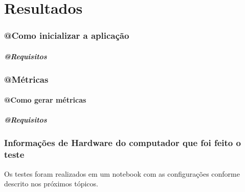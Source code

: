 \part{Resultados}


\section{@Como inicializar a aplicação}

\subsubsection{@Requisitos}

\section{@Métricas}

\subsection{@Como gerar métricas}

\subsubsection{@Requisitos}

\section{Informações de Hardware do computador que foi feito o teste}

Os testes foram realizados em um notebook com as configurações conforme
descrito nos próximos tópicos.

